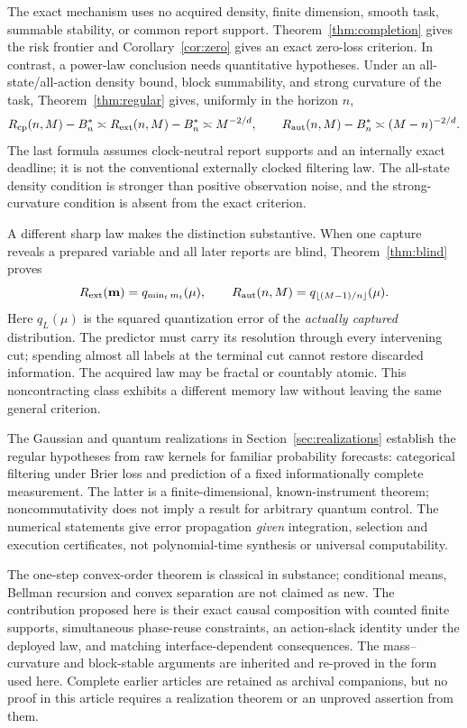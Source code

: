 The exact mechanism uses no acquired density, finite dimension, smooth task, summable stability, or common report support. Theorem~\ref{thm:completion} gives the risk frontier and Corollary~\ref{cor:zero} gives an exact zero-loss criterion. In contrast, a power-law conclusion needs quantitative hypotheses. Under an all-state/all-action density bound, block summability, and strong curvature of the task, Theorem~\ref{thm:regular} gives, uniformly in the horizon $n$,
\begin{equation}\label{eq:intro_regular}
 R_{\mathrm{cp}}(n,M)-B_n^*\asymp R_{\mathrm{ext}}(n,M)-B_n^*\asymp M^{-2/d},
 \qquad R_{\mathrm{aut}}(n,M)-B_n^*\asymp(M-n)^{-2/d}.
\end{equation}
The last formula assumes clock-neutral report supports and an internally exact deadline; it is not the conventional externally clocked filtering law. The all-state density condition is stronger than positive observation noise, and the strong-curvature condition is absent from the exact criterion.

A different sharp law makes the distinction substantive. When one capture reveals a prepared variable and all later reports are blind, Theorem~\ref{thm:blind} proves
\begin{equation}\label{eq:intro_blind}
 R_{\mathrm{ext}}(\mathbf m)=q_{\min_t m_t}(\mu),\qquad
 R_{\mathrm{aut}}(n,M)=q_{\lfloor(M-1)/n\rfloor}(\mu).
\end{equation}
Here $q_L(\mu)$ is the squared quantization error of the \emph{actually captured} distribution. The predictor must carry its resolution through every intervening cut; spending almost all labels at the terminal cut cannot restore discarded information. The acquired law may be fractal or countably atomic. This noncontracting class exhibits a different memory law without leaving the same general criterion.

The Gaussian and quantum realizations in Section~\ref{sec:realizations} establish the regular hypotheses from raw kernels for familiar probability forecasts: categorical filtering under Brier loss and prediction of a fixed informationally complete measurement. The latter is a finite-dimensional, known-instrument theorem; noncommutativity does not imply a result for arbitrary quantum control. The numerical statements give error propagation \emph{given} integration, selection and execution certificates, not polynomial-time synthesis or universal computability.

The one-step convex-order theorem is classical in substance\cite{strassen,blackwell}; conditional means, Bellman recursion and convex separation are not claimed as new. The contribution proposed here is their exact causal composition with counted finite supports, simultaneous phase-reuse constraints, an action-slack identity under the deployed law, and matching interface-dependent consequences. The mass--curvature and block-stable arguments are inherited and re-proved in the form used here\cite{prior}. Complete earlier articles are retained as archival companions, but no proof in this article requires a realization theorem or an unproved assertion from them.
